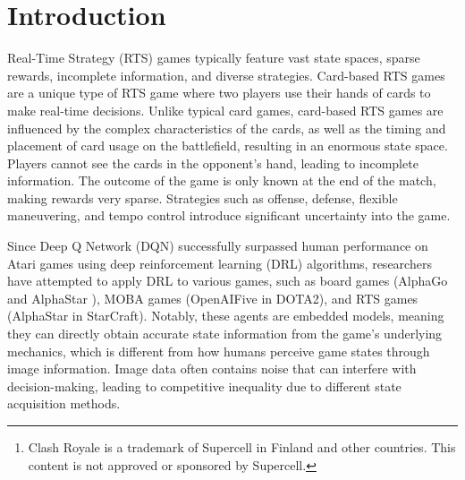 \documentclass[runningheads]{llncs}
\newcounter{algorithm}
\begin{document}
\begin{abstract}
Significant progress has been made in AI for games,
including board games, MOBA, and RTS games.
However, complex agents are typically developed in an embedded manner,
directly accessing game state information, unlike human players who rely on noisy visual data,
leading to unfair competition. Developing complex non-embedded agents remains challenging,
especially in card-based RTS games with complex features and large state spaces.
We propose a non-embedded offline reinforcement learning training strategy
using visual inputs to achieve real-time autonomous gameplay in the RTS game
Clash Royale\footnote{Clash Royale is a trademark of Supercell in Finland and other countries. This content is not approved or sponsored by Supercell.}.
Due to the lack of a object detection dataset for this game, we designed an efficient generative object detection dataset for training.
We extract features using state-of-the-art object detection and optical character recognition models.
Our method enables real-time image acquisition, perception feature fusion, decision-making, and control on mobile devices,
successfully defeating built-in AI opponents. All code is open-sourced at \url{https://github.com/wty-yy/katacr}.
\end{abstract}
%
%
%
\section{Introduction}
Real-Time Strategy (RTS) games typically feature vast state spaces, sparse rewards, incomplete information, and diverse strategies.
Card-based RTS games are a unique type of RTS game where two players use their hands of cards to make real-time decisions.
Unlike typical card games, card-based RTS games are influenced by the complex characteristics of the cards,
as well as the timing and placement of card usage on the battlefield, resulting in an enormous state space.
Players cannot see the cards in the opponent's hand, leading to incomplete information. The outcome of the game is only known at the end of the match,
making rewards very sparse. Strategies such as offense, defense, flexible maneuvering, and tempo control introduce significant uncertainty into the game.

Since Deep Q Network (DQN) \cite{DQN} successfully surpassed human performance on Atari games using deep reinforcement learning (DRL) algorithms,
researchers have attempted to apply DRL to various games, such as board games (AlphaGo \cite{AlphaGo} and AlphaStar \cite{AlphaStar}),
MOBA games (OpenAIFive \cite{OpenAIFive} in DOTA2), and RTS games (AlphaStar \cite{AlphaStar} in StarCraft).
Notably, these agents are embedded models, meaning they can directly obtain accurate state information from the game's underlying mechanics,
which is different from how humans perceive game states through image information. Image data often contains noise that can interfere with decision-making,
leading to competitive inequality due to different state acquisition methods.
\end{document}
